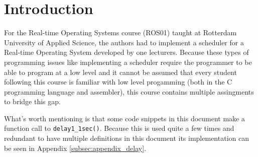 \section{Introduction}

For the Real-time Operating Systems course (ROS01) taught at Rotterdam University of Applied Science,
the authors had to implement a scheduler for a Real-time Operating System developed by one lecturers.
Because these types of programming issues like implementing a scheduler require the programmer to be able to program at a low level and it cannot be assumed that every student following this course is familiar with low level progamming (both in the C programming language and assembler), this course contains multiple assingments to bridge this gap.

What's worth mentioning is that some code snippets in this document make a function call to \texttt{delay1\_1sec()}.
Because this is used quite a few times and redundant to have multiple definitions in this document its implementation can be seen in Appendix \ref{subsec:appendix_delay}.

